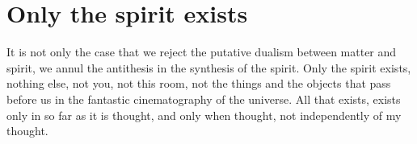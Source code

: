 \section{Only the spirit exists}

\begin{quotex}
It is not only the case that we reject the putative dualism between matter and spirit, we annul the antithesis in the synthesis of the spirit. Only the spirit exists, nothing else, not you, not this room, not the things and the objects that pass before us in the fantastic cinematography of the universe. All that exists, exists only in so far as it is thought, and only when thought, not independently of my thought.
\end{quotex}


